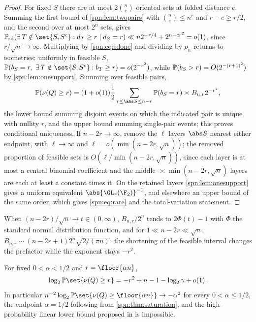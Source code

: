 \begin{proof}
For fixed $S$ there are at most $2\binom ne$ oriented sets at folded distance $e$. Summing the
first bound of \cref{spn:lem:twopairs} with $\binom ne\le n^e$ and $r-e\ge r/2$, and the second over
at most $2^n$ sets, gives
$\spnP_{\mathrm{sd}}(\exists\,T\notin\set{S,S^c}:d_T\ge r\mid d_S=r)\ll n2^{-r/4}+2^{n-cr^2}=o(1)$,
since $r/\sqrt n\to\infty$. Multiplying by \eqref{spn:eq:sdone} and dividing by $p_n$ returns to
isometries: uniformly in feasible $S$,
$\spnP(b_S=r,\ \exists\,T\notin\set{S,S^c}:b_T\ge r)=o(2^{-r^2})$, while
$\mathbb{P}(b_S>r)=O(2^{-(r+1)^2})$ by \cref{spn:lem:onesupport}. Summing over feasible pairs,
\begin{equation}\label{spn:eq:raresum}
 \spnP(\nu(Q)\ge r)=(1+o(1))\frac12\sum_{r\le\abs S\le n-r}\spnP(b_S=r)\asymp B_{n,r}2^{-r^2},
\end{equation}
the lower bound summing disjoint events on which the indicated pair is unique with nullity $r$,
and the upper bound summing single-pair events; this proves conditional uniqueness. If
$n-2r\to\infty$, remove the $\ell$ layers $\abs S$ nearest either endpoint, with $\ell\to\infty$
and $\ell=o(\min(n-2r,\sqrt n))$; the removed proportion of feasible sets is
$O(\ell/\min(n-2r,\sqrt n))$, since each layer is at most a central binomial coefficient and the
middle $\asymp\min(n-2r,\sqrt n)$ layers are each at least a constant times it. On the retained
layers \cref{spn:lem:onesupport} gives a uniform equivalent $\abs{\GL_r(\F_2)}^{-1}$, and
elsewhere an upper bound of the same order, which gives \eqref{spn:eq:rare} and the
total-variation statement.
\end{proof}

When $(n-2r)/\sqrt n\to t\in(0,\infty)$, $B_{n,r}/2^n$ tends to $2\Phi(t)-1$ with $\Phi$ the
standard normal distribution function, and for $1\ll n-2r\ll\sqrt n$,
$B_{n,r}\sim(n-2r+1)2^n\sqrt{2/(\pi n)}$: the shortening of the feasible interval changes the
prefactor while the exponent stays $-r^2$.

\begin{corollary}\label{spn:cor:no-linear}
For fixed $0<\alpha<1/2$ and $r=\floor{\alpha n}$,
\[
 \log_2\spnP\set{\nu(Q)\ge r}=-r^2+n-1-\log_2\gamma+o(1).
\]
In particular $n^{-2}\log_2\spnP\set{\nu(Q)\ge\floor{\alpha n}}\to-\alpha^2$ for every
$0<\alpha\le1/2$, the endpoint $\alpha=1/2$ following from \cref{spn:thm:saturation}, and the
high-probability linear lower bound proposed in \cite{Vaas2026Principal} is impossible.
\end{corollary}

